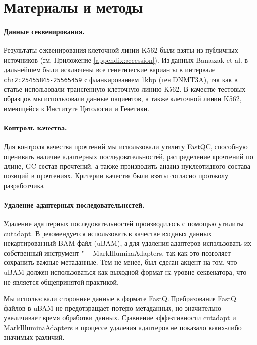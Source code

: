 \documentclass[a4paper,12pt]{article}
\begin{document}
\section{Материалы и методы}

\paragraph{Данные секвенирования.}
Результаты секвенирования клеточной линии K562 были взяты из публичных источников (см. Приложение \ref{appendix:accession}).
Из данных Banaszak et al. в дальнейшем были исключены все генетические варианты в интервале \verb|chr2:25455845-25565459| с фланкированием 1kbp (ген DNMT3A), так как в статье использовали трансгенную клеточную линию K562.
В качестве тестовых образцов мы использовали данные пациентов, а также клеточной линии K562, имеющейся в Институте Цитологии и Генетики.

\paragraph{Контроль качества.}
Для контроля качества прочтений мы использовали утилиту FastQC\cite{fastqc}, способную оценивать наличие адаптерных последовательностей, распределение прочтений по длине, GC-состав прочтений, а также производить анализ нуклеотидного состава позиций в прочтениях.
Критерии качества были взяты согласно протоколу разработчика\cite{fastqc}.

\paragraph{Удаление адаптерных последовательностей.}
Удаление адаптерных последовательностей производилось с помощью утилиты cutadapt\cite{cutadapt}.
В \cite{gatk} рекомендуется использовать в качестве входных данных некартированный BAM-файл (uBAM), а для удаления адаптеров использовать их собственный инструмент "--- MarkIlluminaAdapters, так как это позволяет сохранить важные метаданные.
Тем не менее, был сделан акцент на том, что uBAM должен использоваться как выходной формат на уровне секвенатора, что не является общепринятой практикой.

Мы использовали сторонние данные в формате FastQ.
Пребразование FastQ файлов в uBAM не предотвращает потерю метаданных, но значительно увеличивает время обработки данных.
Сравнение эффективности cutadapt и MarkIlluminaAdapters в процессе удаления адаптеров не показало каких-либо значимых различий.
\end{document}
